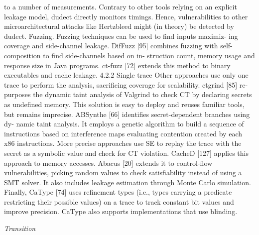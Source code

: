 to a number of measurements. Contrary to other tools relying on
an explicit leakage model, dudect directly monitors timings. Hence,
vulnerabilities to other microarchitectural attacks like Hertzbleed
might (in theory) be detected by dudect.
Fuzzing. Fuzzing techniques can be used to find inputs maximiz-
ing coverage and side-channel leakage. DifFuzz [95] combines
fuzzing with self-composition to find side-channels based on in-
struction count, memory usage and response size in Java programs.
ct-fuzz [72] extends this method to binary executables and cache
leakage.
4.2.2 Single trace Other approaches use only one trace to perform
the analysis, sacrificing coverage for scalability. ctgrind [85] re-
purposes the dynamic taint analysis of Valgrind to check CT by
declaring secrets as undefined memory. This solution is easy to
deploy and reuses familiar tools, but remains imprecise.
ABSynthe [66] identifies secret-dependent branches using dy-
namic taint analysis. It employs a genetic algorithm to build a
sequence of instructions based on interference maps evaluating
contention created by each x86 instructions.
More precise approaches use SE to replay the trace with the
secret as a symbolic value and check for CT violation. CacheD [127]
applies this approach to memory accesses. Abacus [20] extends it
to control-flow vulnerabilities, picking random values to check
satisfiability instead of using a SMT solver. It also includes leakage
estimation through Monte Carlo simulation.
Finally, CaType [74] uses refinement types (i.e., types carrying
a predicate restricting their possible values) on a trace to track
constant bit values and improve precision. CaType also supports
implementations that use blinding.



\raggedbottom
\textit{Transition}

